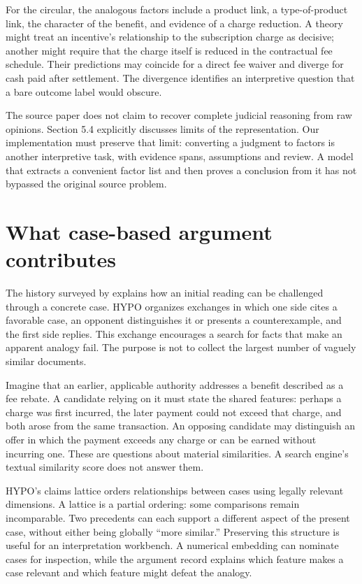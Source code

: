 \documentclass[12pt,a4paper,oneside,openany]{book}
\begin{document}
For the circular, the analogous factors include a product link, a type-of-product
link, the character of the benefit, and evidence of a charge reduction. A theory
might treat an incentive's relationship to the subscription charge as decisive;
another might require that the charge itself is reduced in the contractual fee
schedule. Their predictions may coincide for a direct fee waiver and diverge for
cash paid after settlement. The divergence identifies an interpretive question
that a bare outcome label would obscure.

The source paper does not claim to recover complete judicial reasoning from raw
opinions. Section 5.4 explicitly discusses limits of the representation. Our
implementation must preserve that limit: converting a judgment to factors is
another interpretive task, with evidence spans, assumptions and review. A model
that extracts a convenient factor list and then proves a conclusion from it has
not bypassed the original source problem.

\section{What case-based argument contributes}
\label{merge:M05:02}


The history surveyed by \citet[sections 2--3]{hypolegacy2017} explains how an initial reading can be challenged through a concrete case. HYPO organizes exchanges
in which one side cites a favorable case, an opponent distinguishes it or presents
a counterexample, and the first side replies. This exchange encourages a search
for facts that make an apparent analogy fail. The purpose is not to collect the
largest number of vaguely similar documents.

Imagine that an earlier, applicable authority addresses a benefit described as a
fee rebate. A candidate relying on it must state the shared features: perhaps a
charge was first incurred, the later payment could not exceed that charge, and
both arose from the same transaction. An opposing candidate may distinguish an
offer in which the payment exceeds any charge or can be earned without incurring
one. These are questions about material similarities. A search engine's textual
similarity score does not answer them.

HYPO's claims lattice orders relationships between cases using legally relevant
dimensions. A lattice is a partial ordering: some comparisons remain
incomparable. Two precedents can each support a different aspect of the present
case, without either being globally ``more similar.'' Preserving this structure
is useful for an interpretation workbench. A numerical embedding can nominate
cases for inspection, while the argument record explains which feature makes a
case relevant and which feature might defeat the analogy.
\end{document}
